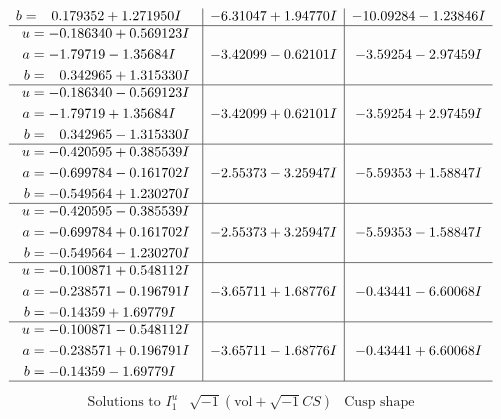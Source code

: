 \documentclass[1p]{elsarticle_modified}
\theoremstyle{definition}
\newcommand{\I}{\sqrt{-1}}
\begin{document}
$$\begin{array}{c|c|c}
\begin{aligned}
b &= \phantom{-}0.179352 + 1.271950 I\end{aligned}
 & -6.31047 + 1.94770 I & -10.09284 - 1.23846 I \\ \hline\begin{aligned}
u &= -0.186340 + 0.569123 I \\
a &= -1.79719 - 1.35684 I \\
b &= \phantom{-}0.342965 + 1.315330 I\end{aligned}
 & -3.42099 - 0.62101 I & -3.59254 - 2.97459 I \\ \hline\begin{aligned}
u &= -0.186340 - 0.569123 I \\
a &= -1.79719 + 1.35684 I \\
b &= \phantom{-}0.342965 - 1.315330 I\end{aligned}
 & -3.42099 + 0.62101 I & -3.59254 + 2.97459 I \\ \hline\begin{aligned}
u &= -0.420595 + 0.385539 I \\
a &= -0.699784 - 0.161702 I \\
b &= -0.549564 + 1.230270 I\end{aligned}
 & -2.55373 - 3.25947 I & -5.59353 + 1.58847 I \\ \hline\begin{aligned}
u &= -0.420595 - 0.385539 I \\
a &= -0.699784 + 0.161702 I \\
b &= -0.549564 - 1.230270 I\end{aligned}
 & -2.55373 + 3.25947 I & -5.59353 - 1.58847 I \\ \hline\begin{aligned}
u &= -0.100871 + 0.548112 I \\
a &= -0.238571 - 0.196791 I \\
b &= -0.14359 + 1.69779 I\end{aligned}
 & -3.65711 + 1.68776 I & -0.43441 - 6.60068 I \\ \hline\begin{aligned}
u &= -0.100871 - 0.548112 I \\
a &= -0.238571 + 0.196791 I \\
b &= -0.14359 - 1.69779 I\end{aligned}
 & -3.65711 - 1.68776 I & -0.43441 + 6.60068 I\\
 \hline 
 \end{array}$$\newpage$$\begin{array}{c|c|c}  
\text{Solutions to }I^u_{1}& \I (\text{vol} + \sqrt{-1}CS) & \text{Cusp shape}\\

\end{array}$$
\end{document}
